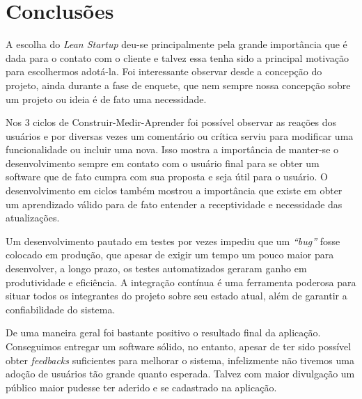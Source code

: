 \chapter{Conclusões}
\label{cap:conclusoes}

\par A escolha do \emph{Lean Startup} deu-se principalmente pela grande importância que é dada para o contato com o cliente e talvez essa tenha sido a principal motivação para escolhermos adotá-la. Foi interessante observar desde a concepção do projeto, ainda durante a fase de enquete, que nem sempre nossa concepção sobre um projeto ou ideia é de fato uma necessidade.

\par Nos 3 ciclos de Construir-Medir-Aprender foi possível observar as reações dos usuários e por diversas vezes um comentário ou crítica serviu para modificar uma funcionalidade ou incluir uma nova. Isso mostra a importância de manter-se o desenvolvimento sempre em contato com o usuário final para se obter um software que de fato cumpra com sua proposta e seja útil para o usuário. O desenvolvimento em ciclos também mostrou a importância que existe em obter um aprendizado válido para de fato entender a receptividade e necessidade das atualizações.

\par Um desenvolvimento pautado em testes por vezes impediu que um \emph{``bug''} fosse colocado em produção, que apesar de exigir um tempo um pouco maior para desenvolver, a longo prazo, os testes automatizados geraram ganho em produtividade e eficiência. A integração contínua é uma ferramenta poderosa para situar todos os integrantes do projeto sobre seu estado atual, além de garantir a confiabilidade do sistema.

\par De uma maneira geral foi bastante positivo o resultado final da aplicação. Conseguimos entregar um software sólido, no entanto, apesar de ter sido possível obter \emph{feedbacks} suficientes para melhorar o sistema, infelizmente não tivemos uma adoção de usuários tão grande quanto esperada. Talvez com maior divulgação um público maior pudesse ter aderido e se cadastrado na aplicação.
